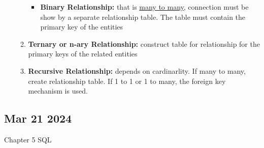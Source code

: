 \documentclass[12pt]{article}
\begin{document}
\begin{itemize}
\begin{enumerate}
\begin{itemize}
						\item \textbf{Binary Relationship:} that is \underline{many to many}, connection must be 
						show by a separate relationship table. The table must contain the primary key of the entities
					\end{itemize}
				\item \textbf{Ternary or n-ary Relationship:} construct table for relationship for the primary keys of
					the related entities 
				\item \textbf{Recursive Relationship:} depends on cardinarlity. If many to many, create relationship
					table. If 1 to 1 or 1 to many, the foreign key mechanism is used. 
		  	\end{enumerate}
\end{itemize}

\subsection*{Mar 21 2024}

Chapter 5 SQL
\end{document}

